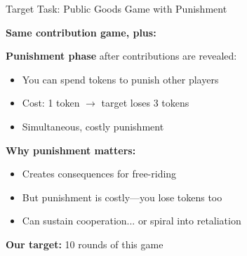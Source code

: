 \documentclass[aspectratio=169]{beamer}
\begin{document}
\begin{frame}{Target Task: Public Goods Game with Punishment}
  
  \textbf{Same contribution game, plus:}
  
  \vspace{1em}
  \textbf{Punishment phase} after contributions are revealed:
  \begin{itemize}
    \item You can spend tokens to punish other players
    \item Cost: 1 token $\to$ target loses 3 tokens
    \item Simultaneous, costly punishment
  \end{itemize}
  
  \vspace{1em}
  \textbf{Why punishment matters:}
  \begin{itemize}
    \item Creates consequences for free-riding
    \item But punishment is costly---you lose tokens too
    \item Can sustain cooperation... or spiral into retaliation
  \end{itemize}
  
  \vspace{0.5em}
  \textbf{Our target:} 10 rounds of this game

\end{frame}
\end{document}
